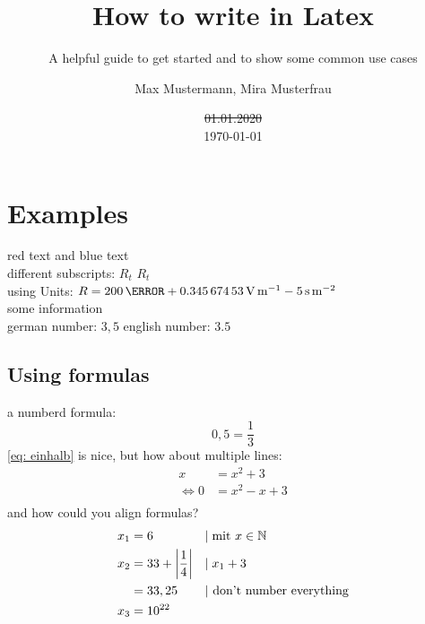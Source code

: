\documentclass[	%
		fontsize=11pt,  %
		a4paper,	    %
		english,		%
		sans,			%
		f1,				%
	]{HsH-report}		%
\author{
	Max Mustermann,
	Mira Musterfrau
}
\title{How to write in Latex}
\subtitle{A helpful guide to get started and to show some common use cases}
\date{\st{01.01.2020}\\\today}
\begin{document}

\maketitle[c]
\declarationAuthorship

\begin{abstract}
	\lipsum[5-6]
\end{abstract}

\tableofcontents


\chapter{Examples} \label{chap: one}
	{\color{red}red text} and {\color{blue}blue text} \\
	different subscripts: \normalsubscripts$R_t$ \upsubscripts$R_t$ \\
	using Units: $R=200\,\mohm + \SI{0.34567453}{\volt\per\metre} - 5\,\si{\second\per\metre\squared}$ \\
	some information\cite{laboranleitung:physik}\\
	german number: $3,5$ english number: $3.5$\\ %


	\section{Using formulas} \label{sec: formula}
		a numberd formula:
		\begin{equation}
			\label{eq: einhalb} %
			0,5=\frac{1}{3}
		\end{equation}
		\autoref{eq: einhalb} is nice, but how about multiple lines:
		\begin{equation}
		\begin{split} %
			x &= x^2+3 \\
			\Leftrightarrow 0 &= x^2-x+3 \\
		\end{split}
		\end{equation}
		and how could you align formulas?
		\begin{align}
			x_1 &= 6 &&|\;\mbox{mit } x \in \mathbb{N} \\
			x_2 &= 33+\left\vert\frac{1}{4}\right\vert &&|\;x_1+3 \\
				&= 33,25 &&\mbox{| don't number everything} \notag \\
			x_3 &= 10^{22}
		\end{align}
\end{document}
